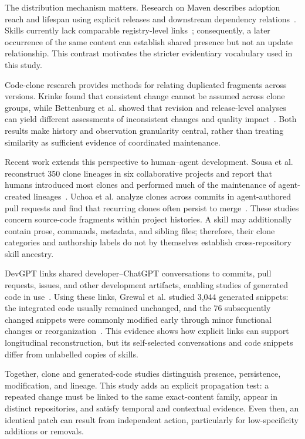 \documentclass[conference]{IEEEtran}
\begin{document}
The distribution mechanism matters. Research on Maven describes adoption reach and lifespan using explicit releases and downstream dependency relations~\cite{berretta2025}. Skills currently lack comparable registry-level links~\cite{gitskills}; consequently, a later occurrence of the same content can establish shared presence but not an update relationship. This contrast motivates the stricter evidentiary vocabulary used in this study.

Code-clone research provides methods for relating duplicated fragments across versions. Krinke found that consistent change cannot be assumed across clone groups, while Bettenburg et al. showed that revision and release-level analyses can yield different assessments of inconsistent changes and quality impact~\cite{krinke2007,bettenburg2012}. Both results make history and observation granularity central, rather than treating similarity as sufficient evidence of coordinated maintenance.

Recent work extends this perspective to human--agent development. Sousa et al. reconstruct 350 clone lineages in six collaborative projects and report that humans introduced most clones and performed much of the maintenance of agent-created lineages~\cite{sousa2026genealogy}. Uchoa et al. analyze clones across commits in agent-authored pull requests and find that recurring clones often persist to merge~\cite{uchoa2026lifecycle}. These studies concern source-code fragments within project histories. A skill may additionally contain prose, commands, metadata, and sibling files; therefore, their clone categories and authorship labels do not by themselves establish cross-repository skill ancestry.

DevGPT links shared developer--ChatGPT conversations to commits, pull requests, issues, and other development artifacts, enabling studies of generated code in use~\cite{devgpt2024}. Using these links, Grewal et al. studied 3,044 generated snippets: the integrated code usually remained unchanged, and the 76 subsequently changed snippets were commonly modified early through minor functional changes or reorganization~\cite{grewal2024}. This evidence shows how explicit links can support longitudinal reconstruction, but its self-selected conversations and code snippets differ from unlabelled copies of skills.

Together, clone and generated-code studies distinguish presence, persistence, modification, and lineage. This study adds an explicit propagation test: a repeated change must be linked to the same exact-content family, appear in distinct repositories, and satisfy temporal and contextual evidence. Even then, an identical patch can result from independent action, particularly for low-specificity additions or removals.
\end{document}
